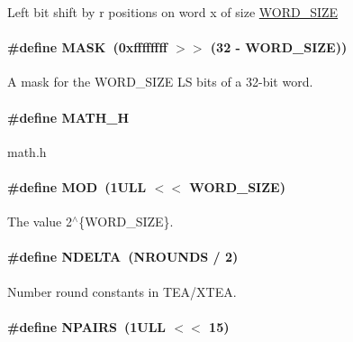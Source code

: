 \-Left bit shift by r positions on word x of size \hyperlink{common_8hh_a92ed8507d1cd2331ad09275c5c4c1c89}{\-W\-O\-R\-D\-\_\-\-S\-I\-Z\-E} \hypertarget{common_8hh_ae7520c5477c11965aabeedc033c9862b}{
\paragraph[{\-M\-A\-S\-K}]{\setlength{\rightskip}{0pt plus 5cm}\#define {\bf \-M\-A\-S\-K}~(0xffffffff $>$$>$ (32 -\/ W\-O\-R\-D\-\_\-\-S\-I\-Z\-E))}}\label{common_8hh_ae7520c5477c11965aabeedc033c9862b}
\-A mask for the \-W\-O\-R\-D\-\_\-\-S\-I\-Z\-E \-L\-S bits of a 32-\/bit word. \hypertarget{common_8hh_acc195fe3f75af2725178e18f3b59ca1b}{
\paragraph[{\-M\-A\-T\-H\-\_\-\-H}]{\setlength{\rightskip}{0pt plus 5cm}\#define {\bf \-M\-A\-T\-H\-\_\-\-H}}}\label{common_8hh_acc195fe3f75af2725178e18f3b59ca1b}
math.\-h \hypertarget{common_8hh_aca7d5718ab8c38506adb3bef2469b319}{
\paragraph[{\-M\-O\-D}]{\setlength{\rightskip}{0pt plus 5cm}\#define {\bf \-M\-O\-D}~(1\-U\-L\-L $<$$<$ W\-O\-R\-D\-\_\-\-S\-I\-Z\-E)}}\label{common_8hh_aca7d5718ab8c38506adb3bef2469b319}
\-The value 2$^\wedge$\{\-W\-O\-R\-D\-\_\-\-S\-I\-Z\-E\}. \hypertarget{common_8hh_ad918c7df882adba39ac2777fbf01248e}{
\paragraph[{\-N\-D\-E\-L\-T\-A}]{\setlength{\rightskip}{0pt plus 5cm}\#define {\bf \-N\-D\-E\-L\-T\-A}~(\-N\-R\-O\-U\-N\-D\-S / 2)}}\label{common_8hh_ad918c7df882adba39ac2777fbf01248e}
\-Number round constants in \-T\-E\-A/\-X\-T\-E\-A. \hypertarget{common_8hh_ad8bbd29e2946d6b269e0009219061ad6}{
\paragraph[{\-N\-P\-A\-I\-R\-S}]{\setlength{\rightskip}{0pt plus 5cm}\#define {\bf \-N\-P\-A\-I\-R\-S}~(1\-U\-L\-L $<$$<$ 15)}}\label{common_8hh_ad8bbd29e2946d6b269e0009219061ad6}
